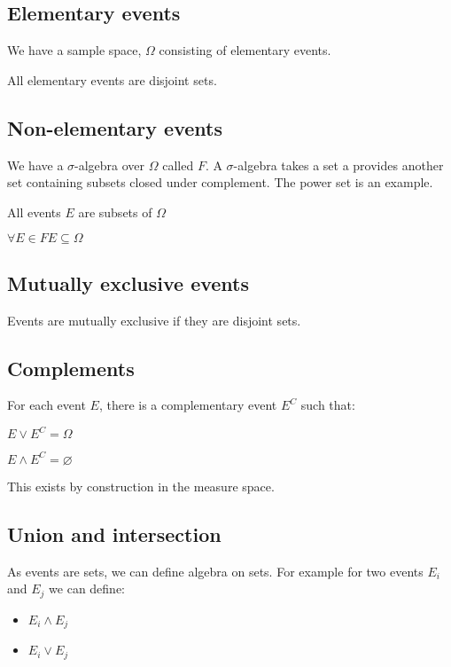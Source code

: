 
\subsection{Elementary events}

We have a sample space, \(\Omega \) consisting of elementary events.

All elementary events are disjoint sets.

\subsection{Non-elementary events}

We have a \(\sigma\)-algebra over \(\Omega \) called \(F\). A \(\sigma\)-algebra takes a set a provides another set containing subsets closed under complement. The power set is an example.

All events \(E\) are subsets of \(\Omega\)

\(\forall E\in F E\subseteq \Omega\)

\subsection{Mutually exclusive events}

Events are mutually exclusive if they are disjoint sets.

\subsection{Complements}

For each event \(E\), there is a complementary event \(E^C\) such that:

$E\lor E^C=\Omega$

$E\land E^C=\varnothing$

This exists by construction in the measure space.

\subsection{Union and intersection}

As events are sets, we can define algebra on sets. For example for two events \(E_i\) and \(E_j\) we can define:

\begin{itemize}
\item \(E_i\land E_j\)
\item \(E_i\lor E_j\)
\end{itemize}

